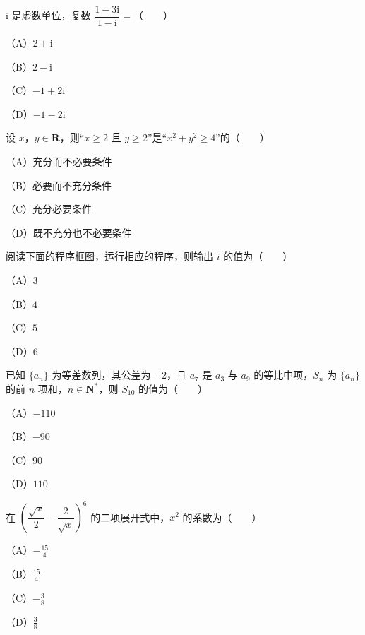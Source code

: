 \begin{question}
$\mathrm{i}$ 是虚数单位，复数 $\dfrac{1-3\mathrm{i}}{1-\mathrm{i}}=$\mbox{（　　）}

（A）$2+\mathrm{i}$

（B）$2-\mathrm{i}$

（C）$-1+2\mathrm{i}$

（D）$-1-2\mathrm{i}$

\end{question}
\begin{question}
设 $x$，$y\in\mathbf{R}$，则“$x\geqslant2$ 且 $y\geqslant2$”是“$x^2+y^2\geqslant4$”的\mbox{（　　）}

（A）充分而不必要条件

（B）必要而不充分条件

（C）充分必要条件

（D）既不充分也不必要条件

\Needspace{0.4\textheight}
\end{question}
\begin{question}
阅读下面的程序框图，运行相应的程序，则输出 $i$ 的值为\mbox{（　　）}

（A）$3$

（B）$4$

（C）$5$

（D）$6$
\nopagebreak[4]
\begin{center}\end{center}
\nopagebreak[4]
\end{question}
\begin{question}
已知 $\{a_n\}$ 为等差数列，其公差为 $-2$，且 $a_7$ 是 $a_3$ 与 $a_9$ 的等比中项，$S_n$ 为 $\{a_n\}$ 的前 $n$ 项和，$n\in\mathbf{N}^*$，则 $S_{10}$ 的值为\mbox{（　　）}

（A）$-110$

（B）$-90$

（C）$90$

（D）$110$

\end{question}
\begin{question}
在 $\left(\dfrac{\sqrt{x}}{2}-\dfrac{2}{\sqrt{x}}\right)^6$ 的二项展开式中，$x^2$ 的系数为\mbox{（　　）}

（A）$-\frac{15}{4}$

（B）$\frac{15}{4}$

（C）$-\frac38$

（D）$\frac38$

\Needspace{0.4\textheight}
\end{question}
